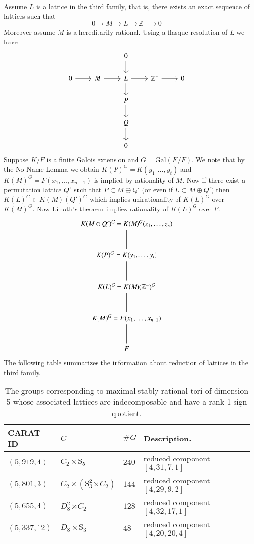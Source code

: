 \documentclass{article}
\theoremstyle{plain}
\theoremstyle{definition}
\newcommand{\Z}{\ensuremath{\mathbb{Z}}}
\newcommand{\exactseqs}[1]{\ensuremath{0 \longrightarrow M_{#1} \longrightarrow L_{#1} \longrightarrow \Z^{-} \longrightarrow 0}}
\begin{document}
\\
Assume $L$ is a lattice in the third family, that is, there exists an exact sequence of lattices such that 
$$\exactseqs{}$$
Moreover assume $M$ is a hereditarily rational. Using a flasque resolution of $L$ we have 
\[
\begin{tikzcd}
  &           & 0                 \arrow{d}                 &            &   \\
  0 \ar{r} & M \arrow{r} & L                 \arrow{r}   \arrow{d}    & \Z^-          \arrow{r} & 0 \\
				    &          & P              \arrow{d}        &     &  \\
                &                                 & Q \arrow{d} &           &   \\
                &                                 & 0                                           &                               &
\end{tikzcd}
\]
Suppose $K/F$ is a finite Galois extension and $G = \mathrm{Gal}(K/F)$. We note that by the No Name Lemma we obtain $K(P)^G = K(y_1, \ldots , y_t)$ and $K(M)^G = F(x_1, \ldots , x_{n-1})$ is implied by rationality of $M$. Now if there exist a permutation lattice $Q'$ such that $P \subset M \oplus Q'$ (or even if $L\subset M \oplus Q'$) then $K(L)^G \subset K(M)(Q')^G$ which implies unirationality of $K(L)^G$ over $K(M)^G$. Now L\"{u}roth's theorem implies rationality of $K(L)^G$ over $F$.
\[
\begin{tikzcd}[row sep=1cm]
K(M \oplus Q')^G = K(M)^G(z_1, \ldots , z_s)\arrow [d,-]  \\
K(P)^G = K(y_1, \ldots , y_t)\arrow [d,-]  \\
K(L)^G =K(M)(\Z^-)^G \arrow [d,-]  \\
K(M)^G = F(x_1, \ldots , x_{n-1}) \arrow [d,-]  \\
F 
\end{tikzcd}
\]
The following table summarizes the information about reduction of lattices in the third family.
 \begin{table}[H]
\centering
\begin{tabular}{lllll} 
 CARAT ID & $G$ & $\#G$ & Description.\\\hline
 $(5,919,4)$ & $C_2\times \mathrm{S}_5$ & $240$  &  reduced component $[4,31,7,1]$ \\
 $(5,801,3)$ & $C_2\times (\mathrm{S}_3^2\rtimes C_2)$ & $144$  &reduced component $[ 4, 29, 9, 2 ]$  \\
 $(5,655,4)$ & $D_8^2\rtimes C_2$ & $128$  & reduced component $[4,32,17,1]$    \\
 $(5,337,12)$ & $D_8\times \mathrm{S}_3$ & $48$  &  reduced component $[ 4, 20, 20, 4 ]$   &\\
\end{tabular}
\caption{The groups corresponding to maximal stably rational tori of dimension 5 whose associated lattices are indecomposable and have a rank 1 sign quotient.}
\label{SignPerm}
\end{table}
\end{document}
